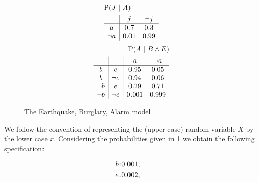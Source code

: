 \documentclass{llncs}
\newcommand{\at}[1]{\ensuremath{\!\del{#1}}}
\newcommand{\pr}[1]{\ensuremath{\mathrm{P}\at{#1}}}
\newcommand{\given}{\ensuremath{~\middle|~}}
\newcommand{\probfact}[2]{\ensuremath{#2\mkern-4mu:\mkern-4mu#1}}
\begin{document}
\begin{figure}
\begin{multicols}{3}
        \footnotesize{
            \begin{equation*}
                \begin{split}
                    &\pr{J \given A}\\
                    &  \begin{array}{c|cc}
                               & j    & \neg j \\
                        \hline
                        a      & 0.7  & 0.3    \\
                        \neg a & 0.01 & 0.99
                    \end{array}
                \end{split}
            \end{equation*}
        }
        \footnotesize{
            \begin{equation*}
                \begin{split}
                    \pr{A \given B \wedge E}\\
                    \begin{array}{c|c|cc}
                               &        & a     & \neg a \\
                        \hline
                        b      & e      & 0.95  & 0.05   \\
                        b      & \neg e & 0.94  & 0.06   \\
                        \neg b & e      & 0.29  & 0.71   \\
                        \neg b & \neg e & 0.001 & 0.999
                    \end{array}
                \end{split}
            \end{equation*}
        }
    \end{multicols}
    \caption{The Earthquake, Burglary, Alarm model}
    \label{Figure_Alarm}
\end{figure}

We follow the convention of representing the (upper case) random variable $X$ by the lower case $x$.
%
Considering the probabilities given in \cref{Figure_Alarm} we obtain the following spe\-ci\-fi\-ca\-tion:

\begin{equation*}
    \begin{aligned}
        \probfact{0.001}{b} & ,\cr
        \probfact{0.002}{e} & ,\cr
    \end{aligned}
    \label{eq:not_so_simple_example}
\end{equation*}
\end{document}
